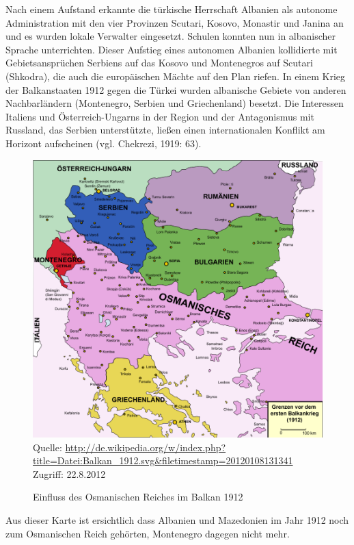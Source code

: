 Nach einem Aufstand erkannte die türkische Herrschaft Albanien als autonome Administration mit den vier Provinzen Scutari, Kosovo, Monastir und Janina an und es wurden lokale Verwalter eingesetzt. Schulen konnten nun in albanischer Sprache unterrichten. Dieser Aufstieg eines autonomen Albanien kollidierte mit Gebietsansprüchen Serbiens auf das Kosovo und Montenegros auf Scutari (Shkodra), die auch die europäischen Mächte auf den Plan riefen. In einem Krieg der Balkanstaaten 1912 gegen die Türkei wurden albanische Gebiete von anderen Nachbarländern (Montenegro, Serbien und Griechenland) besetzt. Die Interessen Italiens und Österreich-Ungarns in der Region und der Antagonismus mit Russland, das Serbien unterstützte, ließen einen internationalen Konflikt am Horizont aufscheinen (vgl. Chekrezi, 1919: 63).

\begin{figure}[H]

  \centering
  \caption{Einfluss des Osmanischen Reiches im Balkan 1912}
  \includegraphics[width=5in]{Material/Balkan_1912}\\
\vspace{0,5cm}
\scriptsize{Quelle:  \url{http://de.wikipedia.org/w/index.php?title=Datei:Balkan_1912.svg&filetimestamp=20120108131341}\\ Zugriff: 22.8.2012}
\end{figure}

Aus dieser Karte ist ersichtlich dass Albanien und Mazedonien im Jahr 1912 noch zum Osmanischen Reich gehörten, Montenegro dagegen nicht mehr.
